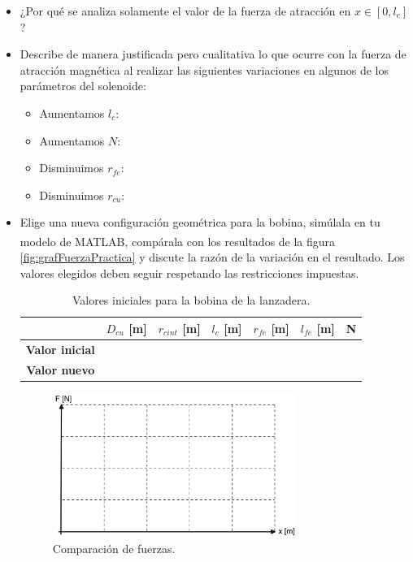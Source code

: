 \begin{itemize}
    \item ¿Por qué se analiza solamente el valor de la fuerza de atracción en \(x \in [0, l_c]\)?
    \vspace{2cm}
    \item Describe de manera justificada pero cualitativa lo que ocurre con la fuerza de atracción magnética al realizar las siguientes variaciones en algunos de los parámetros del solenoide:
    \begin{itemize}
        \item Aumentamos \(l_c\):
        \item Aumentamos \(N\):
        \item Disminuimos \(r_{fe}\):
        \item Disminuimos \(r_{cu}\):
    \end{itemize}
    \item Elige una nueva configuración geométrica para la bobina, simúlala en tu modelo de MATLAB\textsuperscript{\textregistered}, compárala con los resultados de la figura \ref{fig:grafFuerzaPractica} y discute la razón de la variación en el resultado. Los valores elegidos deben seguir respetando las restricciones impuestas.
    
    \begin{table}[H]
        \centering
        \setlength{\tabcolsep}{5pt}
        \renewcommand{\arraystretch}{1.2}
        \begin{tabular}{|c|c|c|c|c|c|c|}
            \hline
            \hbox{} & \textbf{\(D_{cu}\) [m]} & \textbf{\(r_{cint}\) [m]} & \textbf{\(l_c\) [m]} & \textbf{\(r_{fe}\) [m]} & \textbf{\(l_{fe}\) [m]} & \textbf{N} \\
            \hline
            \textbf{Valor inicial} &  &  &  &  &  &  \\
            \hline
            \textbf{Valor nuevo} &  &  &  &  &  &  \\
            \hline
        \end{tabular}
        \caption{Valores iniciales para la bobina de la lanzadera.}
        \label{tab:bobIniPractica2}
    \end{table}

    \begin{figure}[H]
        \centering 
        \includegraphics[width=0.75\textwidth]{FigurasMemoria/grafFuerzaPractica.png}
        \caption{Comparación de fuerzas.}
        \label{fig:grafFuerzaPracticaEjercicio} %
    \end{figure}
    
\end{itemize}



